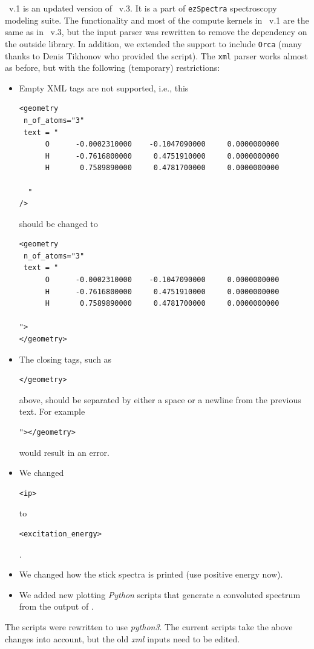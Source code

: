 \documentclass[11pt]{article}
\begin{document}
\ezFCF\ v.1 is an updated version of \ezS\ v.3. It is a part of \texttt{ezSpectra} spectroscopy
modeling suite.  The functionality 
and most of the compute kernels in \ezFCF\ v.1
are the same as in \ezS\ v.3, 
but the input parser was rewritten to remove the dependency on the outside library. In addition, we extended
the support to include {\tt Orca} (many thanks to Denis Tikhonov who provided the script). 
The {\tt xml} parser  works almost as before, but with the following (temporary) restrictions:
  \begin{itemize}
  \item Empty XML tags are not supported, i.e., this
    \renewcommand{\baselinestretch}{1.0}
\begin{verbatim}
<geometry
 n_of_atoms="3"
 text = "
      O      -0.0002310000    -0.1047090000     0.0000000000
      H      -0.7616800000     0.4751910000     0.0000000000
      H       0.7589890000     0.4781700000     0.0000000000

  "
/>
\end{verbatim}
should be changed to
\begin{verbatim}
<geometry
 n_of_atoms="3"
 text = "
      O      -0.0002310000    -0.1047090000     0.0000000000
      H      -0.7616800000     0.4751910000     0.0000000000
      H       0.7589890000     0.4781700000     0.0000000000

">
</geometry>
\end{verbatim}
\renewcommand{\baselinestretch}{1.5}
\item The closing tags, such as \begin{verbatim}</geometry>\end{verbatim} above, should be separated by either a space or a newline from the previous text. For example  \begin{verbatim}"></geometry>\end{verbatim} would result in an error.
\item We changed  \begin{verbatim}<ip>\end{verbatim} to \begin{verbatim}<excitation_energy>\end{verbatim}. 
\item We changed how the stick spectra is printed (use positive energy now). 
\item We added new plotting {\sl Python} scripts that generate a convoluted spectrum from the output of \ezFCF.
  \end{itemize}    
The scripts were rewritten to use {\sl python3}. The current scripts take the above changes into account, but the old {\sl xml} inputs need to be edited. 
\end{document}
